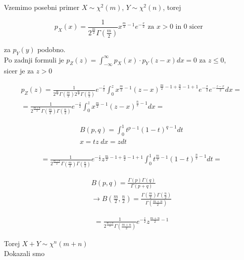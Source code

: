 \documentclass[a4paper,12pt]{article}
\theoremstyle{definition}
\theoremstyle{remark}
\begin{document}
Vzemimo posebni primer $X \sim \chi^2(m)$, $Y \sim \chi^2(n)$, torej

\begin{equation*}
    p_X(x) = \frac{1}{2^{\frac{m}{2}} \Gamma(\frac{m}{2})} x^{\frac{m}{2} - 1} e^{-\frac{x}{2}} \text{ za } x > 0
    \text{ in 0 sicer}
\end{equation*}

za $p_Y(y)$ podobno. \\
Po zadnji formuli je $p_Z(z) = \int_{-\infty}^{\infty} p_X(x) \cdot p_Y(z-x) dx = 0$ za $z \leq 0$, \\
sicer je za $z > 0$

\begin{align*}
    &p_Z(z) = \frac{1}{2^{\frac{m}{2}} \Gamma(\frac{m}{2}) 2^{\frac{m}{2}} \Gamma(\frac{n}{2})} e^{-\frac{z}{2}}
        \int_{0}^{z} x^{\frac{m}{2} - 1} (z-x)^{\frac{m}{2} - 1 + \frac{n}{2} - 1 + 1} e^{-\frac{x}{2}}
        e^{-\frac{z-x}{2}} dx = \\
    &= \frac{1}{2^{\frac{m+n}{2}} \Gamma(\frac{m}{2}) \Gamma(\frac{n}{2})} e^{-\frac{z}{2}}
        \int_0^z x^{\frac{m}{2} - 1} (z-x)^{\frac{n}{2} - 1} dx =
\end{align*}

\begin{align*}
    &B(p,q) = \int_0^1 t^{p-1} (1-t)^{q-1} dt \\
    &x = tz \; dx = z dt
\end{align*}

\begin{align*}
    &= \frac{1}{2^{\frac{m+n}{2}} \Gamma(\frac{m}{2}) \Gamma(\frac{n}{2})} e^{-\frac{z}{2}}
        z^{\frac{m}{2} - 1 + \frac{n}{2} - 1 + 1} \int_0^1 t^{\frac{m}{2} - 1} (1-t)^{\frac{n}{2} - 1} dt =
\end{align*}

\begin{align*}
    &B(p,q) = \frac{\Gamma(p) \Gamma(q)}{\Gamma(p+q)} \\
    &\to B(\frac{m}{2}, \frac{n}{2}) = \frac{\Gamma(\frac{m}{2}) \Gamma(\frac{n}{2})}{\Gamma(\frac{m+n}{2})}
\end{align*}

\begin{align*}
    &= \frac{1}{2^{\frac{m+n}{2}} \Gamma(\frac{m+n}{2})} e^{-\frac{z}{2}} z^{\frac{m+n}{2} - 1}
\end{align*}

Torej $X + Y \sim \chi^n(m+n)$ \\
Dokazali smo
\end{document}
